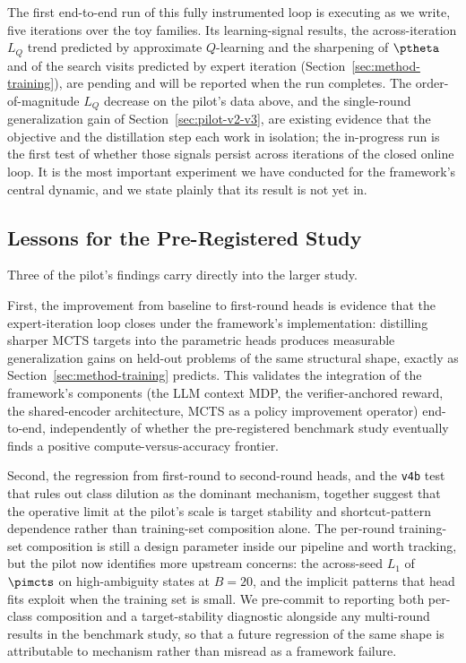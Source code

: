 The first end-to-end run of this fully instrumented loop is executing as we
write, five iterations over the toy families. Its learning-signal results, the
across-iteration $L_Q$ trend predicted by approximate $Q$-learning and the
sharpening of $\ptheta$ and of the search visits predicted by expert iteration
(Section~\ref{sec:method-training}), are pending and will be reported when the
run completes. The order-of-magnitude $L_Q$ decrease on the pilot's data above,
and the single-round generalization gain of Section~\ref{sec:pilot-v2-v3}, are
existing evidence that the objective and the distillation step each work in
isolation; the in-progress run is the first test of whether those signals
persist across iterations of the closed online loop. It is the most important
experiment we have conducted for the framework's central dynamic, and we state
plainly that its result is not yet in.

\subsection{Lessons for the Pre-Registered Study}
\label{sec:pilot-lessons}

Three of the pilot's findings carry directly into the larger study.

First, the improvement from baseline to first-round heads is evidence
that the expert-iteration loop closes under the framework's
implementation: distilling sharper MCTS targets into the parametric
heads produces measurable generalization gains on held-out problems
of the same structural shape, exactly as
Section~\ref{sec:method-training} predicts. This validates the
integration of the framework's components (the LLM context MDP, the
verifier-anchored reward, the shared-encoder architecture, MCTS as a
policy improvement operator) end-to-end, independently of whether the
pre-registered benchmark study eventually finds a positive
compute-versus-accuracy frontier.

Second, the regression from first-round to second-round heads, and
the \texttt{v4b} test that rules out class dilution as the dominant
mechanism, together suggest that the operative limit at the pilot's
scale is target stability and shortcut-pattern dependence rather than
training-set composition alone. The per-round training-set composition
is still a design parameter inside our pipeline and worth tracking,
but the pilot now identifies more upstream concerns: the across-seed
$L_1$ of $\pimcts$ on high-ambiguity states at $B = 20$, and the
implicit patterns that head fits exploit when the training set is
small. We pre-commit to reporting both per-class composition and a
target-stability diagnostic alongside any multi-round results in the
benchmark study, so that a future regression of the same shape is
attributable to mechanism rather than misread as a framework failure.

